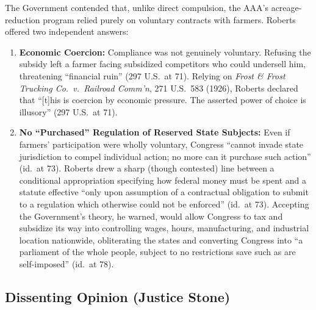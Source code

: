 \documentclass[12pt]{article}
\begin{document}
The Government contended that, unlike direct compulsion, the AAA's acreage-reduction program relied purely on voluntary contracts with farmers. Roberts offered two independent answers:
\begin{enumerate}
  \item \textbf{Economic Coercion:} Compliance was not genuinely voluntary. Refusing the subsidy left a farmer facing subsidized competitors who could undersell him, threatening ``financial ruin'' (297 U.S.\ at 71). Relying on \textit{Frost \& Frost Trucking Co.\ v.\ Railroad Comm'n}, 271 U.S.\ 583 (1926), Roberts declared that ``[t]his is coercion by economic pressure. The asserted power of choice is illusory'' (297 U.S.\ at 71).
  \item \textbf{No ``Purchased'' Regulation of Reserved State Subjects:} Even if farmers' participation were wholly voluntary, Congress ``cannot invade state jurisdiction to compel individual action; no more can it purchase such action'' (id.\ at 73). Roberts drew a sharp (though contested) line between a conditional appropriation specifying how federal money must be spent and a statute effective ``only upon assumption of a contractual obligation to submit to a regulation which otherwise could not be enforced'' (id.\ at 73). Accepting the Government's theory, he warned, would allow Congress to tax and subsidize its way into controlling wages, hours, manufacturing, and industrial location nationwide, obliterating the states and converting Congress into ``a parliament of the whole people, subject to no restrictions save such as are self-imposed'' (id.\ at 78).
\end{enumerate}

\subsection{Dissenting Opinion (Justice Stone)}
\end{document}
